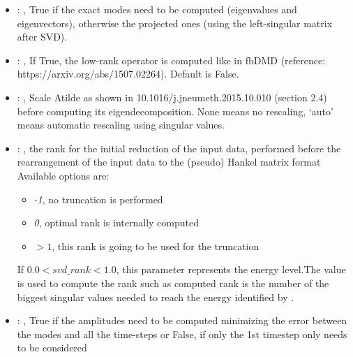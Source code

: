 \begin{itemize}
    \item {}: , 
      True if the exact modes need to be computed (eigenvalues and
      eigenvectors),   otherwise the projected ones (using the left-singular matrix after SVD).

    \item {}: , 
      If True, the low-rank operator is computed like in fbDMD (reference:
      https://arxiv.org/abs/1507.02264).                                                  Default is
      False.

    \item {}: , 
      Scale Atilde as shown in 10.1016/j.jneumeth.2015.10.010 (section 2.4) before computing its
      eigendecomposition. None means no rescaling, ‘auto’ means automatic rescaling using singular
      values.

    \item {}: , 
      the rank for the initial reduction of the input data, performed before the rearrangement
      of the input data to the (pseudo) Hankel matrix format
      Available options are:                                                  \begin{itemize}
      \item \textit{-1}, no truncation is performed
      \item \textit{0}, optimal rank is internally computed
      \item \textit{$>1$}, this rank is going to be used for the truncation
      \end{itemize}                                                  If $0.0 < svd\_rank < 1.0$,
      this parameter represents the energy level.The value is used to compute the rank such
      as computed rank is the number of the biggest singular values needed to reach the energy
      identified by                                                    .

    \item {}: , 
      True if the amplitudes need to be computed minimizing the error
      between the modes and all the time-steps or False, if only the 1st timestep only needs to be
      considered


\end{itemize}
